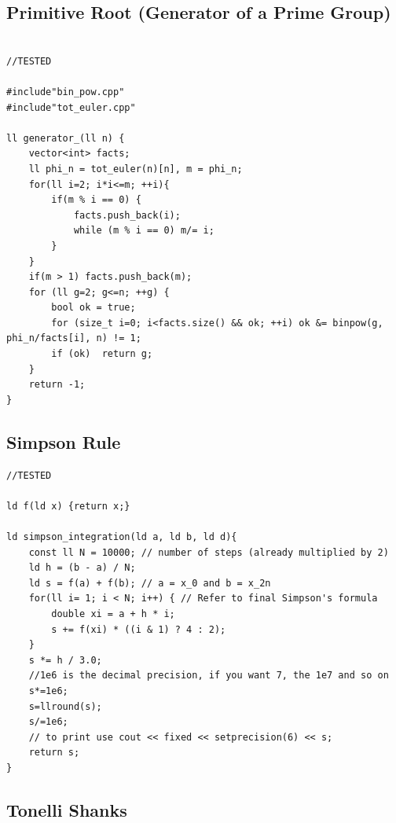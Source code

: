 \documentclass[10pt,a4paper,twocolumn]{article}
\begin{document}
	\subsection{Primitive Root (Generator of a Prime Group)}
	
	\begin{lstlisting}[style=cpp, title={primitive-root.cpp}]

//TESTED

#include"bin_pow.cpp"
#include"tot_euler.cpp"

ll generator_(ll n) {
    vector<int> facts;
    ll phi_n = tot_euler(n)[n], m = phi_n;
    for(ll i=2; i*i<=m; ++i){
        if(m % i == 0) {
            facts.push_back(i);
            while (m % i == 0) m/= i;
        }
    }
    if(m > 1) facts.push_back(m);
    for (ll g=2; g<=n; ++g) {
        bool ok = true;
        for (size_t i=0; i<facts.size() && ok; ++i) ok &= binpow(g, phi_n/facts[i], n) != 1;
        if (ok)  return g;
    }
    return -1;
}
	\end{lstlisting}

	\subsection{Simpson Rule}
	
	\begin{lstlisting}[style=cpp, title={SimpsonRule.cpp}]
//TESTED

ld f(ld x) {return x;}

ld simpson_integration(ld a, ld b, ld d){
    const ll N = 10000; // number of steps (already multiplied by 2)
    ld h = (b - a) / N;
    ld s = f(a) + f(b); // a = x_0 and b = x_2n
    for(ll i= 1; i < N; i++) { // Refer to final Simpson's formula
        double xi = a + h * i;
        s += f(xi) * ((i & 1) ? 4 : 2);
    }
    s *= h / 3.0;
    //1e6 is the decimal precision, if you want 7, the 1e7 and so on
    s*=1e6;
    s=llround(s);
    s/=1e6;
    // to print use cout << fixed << setprecision(6) << s;
    return s;
}
	\end{lstlisting}

	\subsection{Tonelli Shanks}
	
\end{document}
